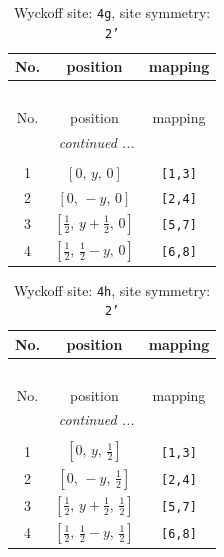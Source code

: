 \documentclass[fleqn,8pt]{jsarticle}
\begin{document}
\renewcommand{\arraystretch}{1.2}
\begin{longtable}{ccc}
\caption{Wyckoff site: {\tt 4g}, site symmetry: {\tt 2'}}
 \\
 \hline \hline
No. & position & mapping \\ \hline \endfirsthead

\multicolumn{2}{l}{\tablename\ \thetable{}} \\
 \hline \hline
No. & position & mapping \\ \hline \endhead

 \hline \hline
\multicolumn{2}{r}{\footnotesize\it continued ...} \\ \endfoot

 \hline \hline
\multicolumn{2}{r}{} \\ \endlastfoot

1 & $\left[ 0,\, y,\, 0 \right]$ & {\tt [1,3]} \\ \hline
2 & $\left[ 0,\, - y,\, 0 \right]$ & {\tt [2,4]} \\ \hline
3 & $\left[ \frac{1}{2},\, y + \frac{1}{2},\, 0 \right]$ & {\tt [5,7]} \\ \hline
4 & $\left[ \frac{1}{2},\, \frac{1}{2} - y,\, 0 \right]$ & {\tt [6,8]} \\
\end{longtable}
\renewcommand{\arraystretch}{1.2}
\begin{longtable}{ccc}
\caption{Wyckoff site: {\tt 4h}, site symmetry: {\tt 2'}}
 \\
 \hline \hline
No. & position & mapping \\ \hline \endfirsthead

\multicolumn{2}{l}{\tablename\ \thetable{}} \\
 \hline \hline
No. & position & mapping \\ \hline \endhead

 \hline \hline
\multicolumn{2}{r}{\footnotesize\it continued ...} \\ \endfoot

 \hline \hline
\multicolumn{2}{r}{} \\ \endlastfoot

1 & $\left[ 0,\, y,\, \frac{1}{2} \right]$ & {\tt [1,3]} \\ \hline
2 & $\left[ 0,\, - y,\, \frac{1}{2} \right]$ & {\tt [2,4]} \\ \hline
3 & $\left[ \frac{1}{2},\, y + \frac{1}{2},\, \frac{1}{2} \right]$ & {\tt [5,7]} \\ \hline
4 & $\left[ \frac{1}{2},\, \frac{1}{2} - y,\, \frac{1}{2} \right]$ & {\tt [6,8]} \\
\end{longtable}
\end{document}
